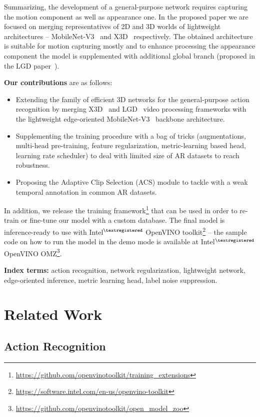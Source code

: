 \documentclass[twoside, twocolumn]{article}
\begin{document}
Summarizing, the development of a general-purpose network requires capturing the motion component as well as appearance
one. In the proposed paper we are focused on merging representatives of 2D and 3D worlds of lightweight architectures --
MobileNet-V3~\cite{MN-V3} and X3D~\cite{X3D} respectively. The obtained architecture is suitable for motion capturing
mostly and to enhance processing the appearance component the model is supplemented with additional global branch
(proposed in the LGD paper~\cite{LGD}).

\textbf{Our contributions} are as follows:
\begin{itemize}
\item Extending the family of efficient 3D networks for the general-purpose action recognition by merging X3D~\cite{X3D}
and LGD~\cite{LGD} video processing frameworks with the lightweight edge-oriented MobileNet-V3~\cite{MN-V3} backbone
architecture.
\item Supplementing the training procedure with a bag of tricks (augmentations, multi-head pre-training, feature
regularization, metric-learning based head, learning rate scheduler) to deal with limited size of AR datasets to reach
robustness.
\item Proposing the Adaptive Clip Selection (ACS) module to tackle with a weak temporal annotation in common AR
datasets.
\end{itemize}

In addition, we release the training framework\footnote{\url{https://github.com/openvinotoolkit/training_extensions}}
that can be used in order to re-train or fine-tune our model with a custom database. The final model is inference-ready
to use with Intel$^{\textregistered}$ OpenVINO\texttrademark
toolkit\footnote{\url{https://software.intel.com/en-us/openvino-toolkit}} -- the sample code on how to run the model in
the demo mode is available at Intel$^{\textregistered}$ OpenVINO\texttrademark
OMZ\footnote{\url{https://github.com/openvinotoolkit/open_model_zoo}}.

\textbf{Index terms:} action recognition, network regularization, lightweight network, edge-oriented inference, metric
learning head, label noise suppression.



\section{Related Work}

\subsection{Action Recognition}
\end{document}

